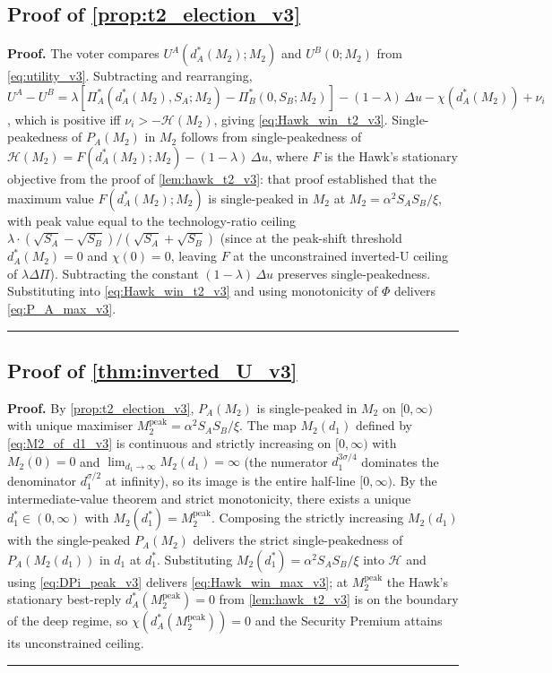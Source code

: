 \documentclass[11pt,twoside]{extarticle}
\newenvironment{proof}[1][Proof]{\noindent \textbf{#1.} }{\ \rule{0.5em}{0.5em}}
\begin{document}
\subsection*{Proof of \autoref{prop:t2_election_v3}} \label{app:proof:t2_election_v3}
\begin{proof}
The voter compares $U^A(d_A^*(M_2);M_2)$ and $U^B(0;M_2)$ from \autoref{eq:utility_v3}. Subtracting and rearranging,
$U^A-U^B=\lambda[\Pi_A^*(d_A^*(M_2),S_A;M_2)-\Pi_B^*(0,S_B;M_2)]-(1-\lambda)\,\Delta u-\chi(d_A^*(M_2))+\nu_i$, which is positive iff $\nu_i>-\mathcal H(M_2)$, giving \autoref{eq:Hawk_win_t2_v3}. Single-peakedness of $P_A(M_2)$ in $M_2$ follows from single-peakedness of $\mathcal H(M_2)=F(d_A^*(M_2);M_2)-(1-\lambda)\,\Delta u$, where $F$ is the Hawk's stationary objective from the proof of \autoref{lem:hawk_t2_v3}: that proof established that the maximum value $F(d_A^*(M_2);M_2)$ is single-peaked in $M_2$ at $M_2=\alpha^2 S_A S_B/\xi$, with peak value equal to the technology-ratio ceiling $\lambda\cdot(\sqrt{S_A}-\sqrt{S_B})/(\sqrt{S_A}+\sqrt{S_B})$ (since at the peak-shift threshold $d_A^*(M_2)=0$ and $\chi(0)=0$, leaving $F$ at the unconstrained inverted-U ceiling of $\lambda\Delta\Pi$). Subtracting the constant $(1-\lambda)\,\Delta u$ preserves single-peakedness. Substituting into \autoref{eq:Hawk_win_t2_v3} and using monotonicity of $\Phi$ delivers \autoref{eq:P_A_max_v3}.
\end{proof}

\subsection*{Proof of \autoref{thm:inverted_U_v3}} \label{app:proof:inverted_U_v3}
\begin{proof}
By \autoref{prop:t2_election_v3}, $P_A(M_2)$ is single-peaked in $M_2$ on $[0,\infty)$ with unique maximiser $M_2^{\mathrm{peak}}=\alpha^2 S_A S_B/\xi$. The map $M_2(d_1)$ defined by \autoref{eq:M2_of_d1_v3} is continuous and strictly increasing on $[0,\infty)$ with $M_2(0)=0$ and $\lim_{d_1\to\infty}M_2(d_1)=\infty$ (the numerator $d_1^{3\sigma/4}$ dominates the denominator $d_1^{\sigma/2}$ at infinity), so its image is the entire half-line $[0,\infty)$. By the intermediate-value theorem and strict monotonicity, there exists a unique $d_1^*\in(0,\infty)$ with $M_2(d_1^*)=M_2^{\mathrm{peak}}$. Composing the strictly increasing $M_2(d_1)$ with the single-peaked $P_A(M_2)$ delivers the strict single-peakedness of $P_A(M_2(d_1))$ in $d_1$ at $d_1^*$. Substituting $M_2(d_1^*)=\alpha^2 S_A S_B/\xi$ into $\mathcal H$ and using \autoref{eq:DPi_peak_v3} delivers \autoref{eq:Hawk_win_max_v3}; at $M_2^{\mathrm{peak}}$ the Hawk's stationary best-reply $d_A^*(M_2^{\mathrm{peak}})=0$ from \autoref{lem:hawk_t2_v3} is on the boundary of the deep regime, so $\chi(d_A^*(M_2^{\mathrm{peak}}))=0$ and the Security Premium attains its unconstrained ceiling.
\end{proof}
\end{document}
